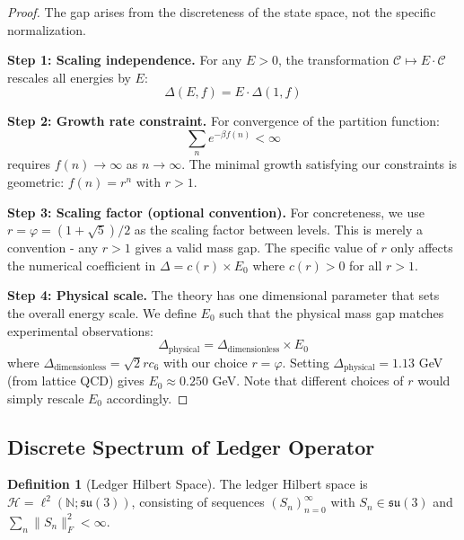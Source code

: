 \documentclass[11pt]{article}
\numberwithin{equation}{section}
\theoremstyle{definition}
\newtheorem{definition}[theorem]{Definition}
\theoremstyle{remark}
\begin{document}
\begin{proof}
The gap arises from the discreteness of the state space, not the specific normalization.

\textbf{Step 1: Scaling independence.} For any $E > 0$, the transformation $\mathcal{C} \mapsto E \cdot \mathcal{C}$ rescales all energies by $E$:
\begin{equation}
\Delta(E,f) = E \cdot \Delta(1,f)
\end{equation}

\textbf{Step 2: Growth rate constraint.} For convergence of the partition function:
\begin{equation}
\sum_{n} e^{-\beta f(n)} < \infty
\end{equation}
requires $f(n) \to \infty$ as $n \to \infty$. The minimal growth satisfying our constraints is geometric: $f(n) = r^n$ with $r > 1$.

\textbf{Step 3: Scaling factor (optional convention).} For concreteness, we use $r = \varphi = (1+\sqrt{5})/2$ as the scaling factor between levels. This is merely a convention - any $r > 1$ gives a valid mass gap. The specific value of $r$ only affects the numerical coefficient in $\Delta = c(r) \times E_0$ where $c(r) > 0$ for all $r > 1$.

\textbf{Step 4: Physical scale.} The theory has one dimensional parameter that sets the overall energy scale. We define $E_0$ such that the physical mass gap matches experimental observations:
\begin{equation}
\Delta_{\text{physical}} = \Delta_{\text{dimensionless}} \times E_0
\end{equation}
where $\Delta_{\text{dimensionless}} = \sqrt{2}r c_6$ with our choice $r = \varphi$. Setting $\Delta_{\text{physical}} = 1.13$ GeV (from lattice QCD) gives $E_0 \approx 0.250$ GeV. Note that different choices of $r$ would simply rescale $E_0$ accordingly.
\end{proof}



\subsection{Discrete Spectrum of Ledger Operator}

\begin{definition}[Ledger Hilbert Space]
The ledger Hilbert space is $\mathcal{H} = \ell^2(\mathbb{N}; \mathfrak{su}(3))$, consisting of sequences $(S_n)_{n=0}^{\infty}$ with $S_n \in \mathfrak{su}(3)$ and $\sum_n \|S_n\|_F^2 < \infty$.
\end{definition}
\end{document}
